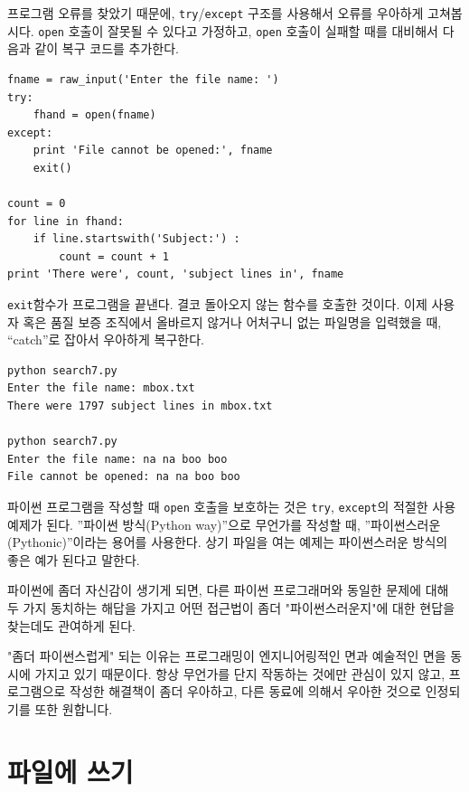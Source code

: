 
프로그램 오류를 찾았기 때문에, {\tt try}/{\tt except} 구조를 사용해서 오류를 우아하게 고쳐봅시다.
{\tt open} 호출이 잘못될 수 있다고 가정하고, {\tt open} 호출이 실패할 때를 대비해서 다음과 같이 복구 코드를 추가한다.

\beforeverb
\begin{verbatim}
fname = raw_input('Enter the file name: ')
try:
    fhand = open(fname)
except:
    print 'File cannot be opened:', fname
    exit()

count = 0
for line in fhand:
    if line.startswith('Subject:') : 
        count = count + 1
print 'There were', count, 'subject lines in', fname
\end{verbatim}
\afterverb
%

{\tt exit}함수가 프로그램을 끝낸다. 
결코 돌아오지 않는 함수를 호출한 것이다.
이제 사용자 혹은 품질 보증 조직에서 올바르지 않거나 어처구니 없는 파일명을 입력했을 때, 
``catch''로 잡아서 우아하게 복구한다.

\beforeverb
\begin{verbatim}
python search7.py
Enter the file name: mbox.txt
There were 1797 subject lines in mbox.txt

python search7.py
Enter the file name: na na boo boo
File cannot be opened: na na boo boo
\end{verbatim}
\afterverb
%

파이썬 프로그램을 작성할 때 {\tt open} 호출을 보호하는 것은 {\tt try}, {\tt except}의 적절한 사용 예제가 된다.
''파이썬 방식(Python way)''으로 무언가를 작성할 때, ''파이썬스러운(Pythonic)''이라는 용어를 사용한다.
상기 파일을 여는 예제는 파이썬스러운 방식의 좋은 예가 된다고 말한다.

파이썬에 좀더 자신감이 생기게 되면, 다른 파이썬 프로그래머와 동일한 문제에 대해 
두 가지 동치하는 해답을 가지고 어떤 접근법이 좀더 "파이썬스러운지"에 대한 현답을 찾는데도 관여하게 된다.

"좀더 파이썬스럽게" 되는 이유는 프로그래밍이 엔지니어링적인 면과 예술적인 면을 동시에 가지고 있기 때문이다.
항상 무언가를 단지 작동하는 것에만 관심이 있지 않고, 프로그램으로 작성한 해결책이 좀더 우아하고, 다른 동료에 의해서 우아한 것으로 인정되기를 또한 원합니다.

\section{파일에 쓰기}

